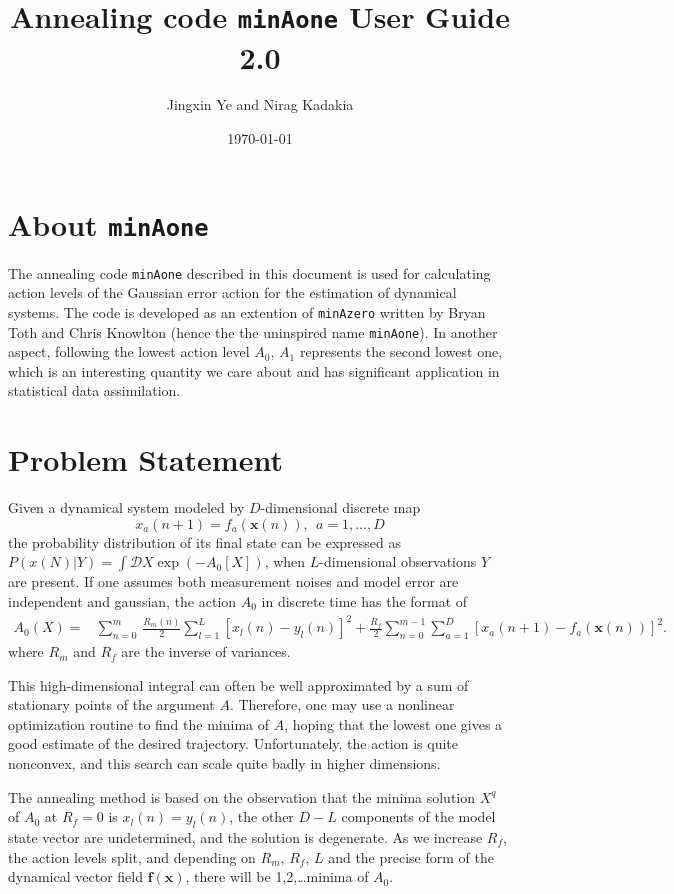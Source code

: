 \documentclass[11pt]{article}
\title{\textbf{Annealing code \texttt{minAone} User Guide} 2.0}
\author{Jingxin Ye and Nirag Kadakia}
\date{\today}
\begin{document}
\maketitle
\tableofcontents
\newpage
\section{About \texttt{minAone}}
The annealing code \texttt{minAone} described in this document is used for calculating action levels of the Gaussian error action for the estimation of dynamical systems. The code is developed as an extention of \texttt{minAzero} written by Bryan Toth and Chris Knowlton (hence the the uninspired name \texttt{minAone}). In another aspect, following the lowest action level $A_0$, $A_1$ represents the second lowest one, which is an interesting quantity we care about and has significant application in statistical data assimilation.

\section{Problem Statement}
Given a dynamical system modeled by $D$-dimensional discrete map
\[{x_a}(n+1)=f_a(\mathbf{x}(n)),~~a=1,\dots,D\]
the probability distribution of its final state can be expressed as $P(x(N)|Y)=\int \mathcal {D}X \exp(-A_0[X])$, when $L$-dimensional observations $Y$ are present.  If one assumes both measurement noises and model error are independent and gaussian, the action $A_0$ in discrete time has the format of
\begin{align}
A_0(X) = &\sum_{n=0}^m\, \frac{R_m(n)}{2} \sum_{l=1}^L [x_l(n) - y_l(n)]^2 +  \frac{R_f}{2} \sum_{n=0}^{m-1} \sum_{a=1}^D[x_a(n+1) - f_a(\mathbf{x}(n))]^2 .
\label{eq:actionform}
\end{align}
where $R_m$ and $R_f$ are the inverse of variances.

This high-dimensional integral can often be well approximated by a sum of stationary points of the argument $A$. Therefore, one may use a nonlinear optimization routine to find the minima of $A$, hoping that the lowest one gives a good estimate of the desired trajectory. Unfortunately, the action is quite nonconvex, and this search can scale quite badly in higher dimensions. 

The annealing method is based on the observation that the minima solution $X^q$ of $A_0$ at $R_f=0$ is $x_l(n)=y_l(n)$, the other $D-L$ components of the model state vector are undetermined, and the solution is degenerate. As we increase $R_f$, the action levels split, and depending on $R_m$, $R_f$, $L$ and the precise form of the dynamical vector field $\mathbf{f}(\mathbf{x})$, there will be 1,2,\dots minima of $A_0$.
\end{document}
